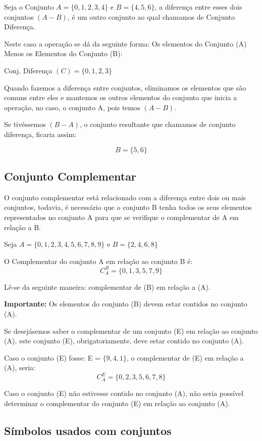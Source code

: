 \begin{multicols*}{2}
	Seja o Conjunto $A = \{{ 0, 1, 2, 3, 4 }\}$ e $B = \{ 4, 5, 6 \}$, a diferença entre esses dois conjuntos $(A - B)$, é um outro conjunto ao qual chamamos de Conjunto Diferença.

	Neste caso a operação se dá da seguinte forma: Os elementos do Conjunto (A) Menos os Elementos do Conjunto (B):

	Conj. Diferença $(C) =  \{ 0, 1, 2, 3 \}$

	Quando fazemos a diferença entre conjuntos, eliminamos os elementos que são comuns entre eles e mantemos os outros elementos do conjunto que inicia a operação, no caso, o conjunto A, pois temos $(A - B)$.

	Se tivéssemos $(B - A)$, o conjunto resultante que chamamos de conjunto diferença, ficaria assim:

	\[B = \{ 5, 6 \}\]

	\subsection*{Conjunto Complementar}

	O conjunto complementar está relacionado com a diferença entre dois ou mais conjuntos, todavia, é necessário que o conjunto B tenha todos os seus elementos representados no conjunto A para que se verifique o complementar de A em relação a B.

	Seja $A =\{0,1, 2, 3, 4, 5, 6, 7, 8, 9\} $ e $ B = \{ 2, 4, 6, 8\} $

	O Complementar do conjunto A em relação ao conjunto B é:
	\[ C_A^B = \{0, 1, 3, 5, 7, 9 \} \]

	Lê-se da seguinte maneira: complementar de (B) em relação a (A).

	\textbf{Importante:} Os elementos do conjunto (B) devem estar contidos no conjunto (A).

	Se desejásemos saber o complementar de um conjunto (E) em relação ao conjunto (A), este conjunto (E), obrigatoriamente, deve estar contido no conjunto (A).

	Caso o conjunto (E) fosse: E = $\{9, 4, 1\}$, o complementar de (E) em relação a (A), seria:
	\[C_A^E = \{ 0, 2, 3, 5, 6, 7, 8\}\]

	Caso o conjunto (E) não estivesse contido no conjunto (A), não seria possível determinar o complementar do conjunto (E) em relação ao conjunto (A).

	\subsection*{Símbolos usados com conjuntos}


\end{multicols*}
